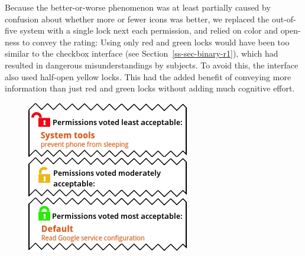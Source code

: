 \documentclass[11pt]{article}
\newcommand{\refsec}[1]{Section~\ref{#1}}
\begin{document}
Because the better-or-worse phenomenon was at least partially caused 
by confusion about whether more or fewer icons was better, we 
replaced the out-of-five system with 
a single lock next each permission, and relied on 
color and open-ness to convey the rating:
\label{ss-sec-locks-r3}
Using
only red and green locks would have been too similar to the checkbox
interface (see \refsec{ss-sec-binary-r1}), 
which had resulted in dangerous misunderstandings by subjects. 
To avoid this, the interface also used half-open yellow 
locks. This 
had the added benefit of conveying more 
information than just red and green locks without adding much cognitive 
effort.

\begin{figure}
\begin{center}
\includegraphics[width=.9\linewidth]{candidate-img/locks/locksR4.png}
\end{center}
\end{figure}
\end{document}
